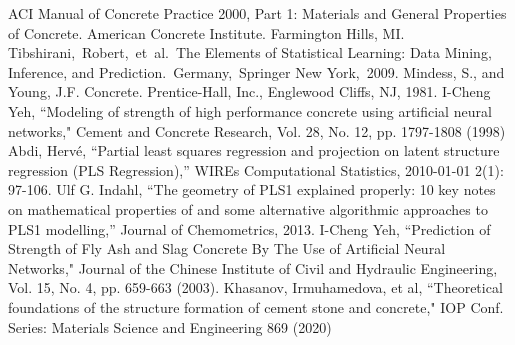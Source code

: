\documentclass[conference]{IEEEtran}
\begin{document}
\begin{thebibliography}{00}
 ACI Manual of Concrete Practice 2000, Part 1: Materials and General Properties of Concrete.  American Concrete Institute.  Farmington Hills, MI.
 Tibshirani, Robert, et al. The Elements of  Statistical Learning:  Data Mining, Inference, and Prediction. Germany, Springer New York, 2009.
 Mindess, S., and Young, J.F. Concrete. Prentice-Hall, Inc., Englewood Cliffs, NJ, 1981.
 I-Cheng Yeh, ``Modeling of strength of high performance concrete using artificial neural networks," Cement and Concrete Research, Vol. 28, No. 12, pp. 1797-1808 (1998)
 Abdi, Hervé, ``Partial least squares regression and projection on latent structure regression (PLS Regression),'' WIREs Computational Statistics, 2010-01-01 2(1): 97-106.
 Ulf G. Indahl, ``The geometry of PLS1 explained properly: 10 key notes on mathematical properties of and some alternative algorithmic approaches to PLS1 modelling,'' Journal of Chemometrics, 2013.
 I-Cheng Yeh, ``Prediction of Strength of Fly Ash and Slag Concrete By The Use of Artificial Neural Networks," Journal of the Chinese Institute of Civil and Hydraulic Engineering, Vol. 15, No. 4, pp. 659-663 (2003). 
 Khasanov, Irmuhamedova, et al, ``Theoretical foundations of the structure formation of cement stone
and concrete," IOP Conf. Series: Materials Science and Engineering 869 (2020)
\end{thebibliography}
\end{document}
